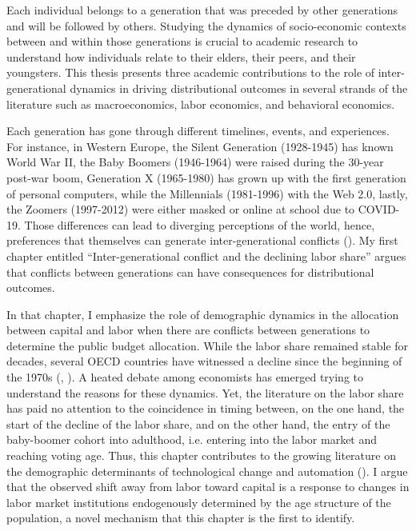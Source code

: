Each individual belongs to a generation that was preceded by other generations and will be followed by others. Studying the dynamics of socio-economic contexts between and within those generations is crucial to academic research to understand how individuals relate to their elders, their peers, and their youngsters. This thesis presents three academic contributions to the role of inter-generational dynamics in driving distributional outcomes in several strands of the literature such as macroeconomics, labor economics, and behavioral economics.

Each generation has gone through different timelines, events, and experiences. For instance, in Western Europe, the Silent Generation (1928-1945) has known World War II, the Baby Boomers (1946-1964) were raised during the 30-year post-war boom, Generation X (1965-1980) has grown up with the first generation of personal computers, while the Millennials (1981-1996) with the Web 2.0, lastly, the Zoomers (1997-2012) were either masked or online at school due to COVID-19.
Those differences can lead to diverging perceptions of the world, hence, preferences that themselves can generate inter-generational conflicts (\citealt{meisner2021you}). My first chapter entitled ``Inter-generational conflict and the declining labor share'' argues that conflicts between generations can have consequences for distributional outcomes.

In that chapter, I emphasize the role of demographic dynamics in the allocation between capital and labor when there are conflicts between generations to determine the public budget allocation. While the labor share remained stable for decades, several OECD countries have witnessed a decline since the beginning of the 1970s (\citealt{Elsby2013Decline}, \citealt{Karabarbounis2014Global}). A heated debate among economists has emerged trying to understand the reasons for these dynamics. Yet, the literature on the labor share has paid no attention to the coincidence in timing between, on the one hand, the start of the decline of the labor share, and on the other hand, the entry of the baby-boomer cohort into adulthood, i.e. entering into the labor market and reaching voting age. 
Thus, this chapter contributes to the growing literature on the demographic determinants of technological change and automation (\citealt{Acemoglu2018Race, Acemoglu2020Robots}). I argue that the observed shift away from labor toward capital is a response to changes in labor market institutions endogenously determined by the age structure of the population, a novel mechanism that this chapter is the first to identify. 

